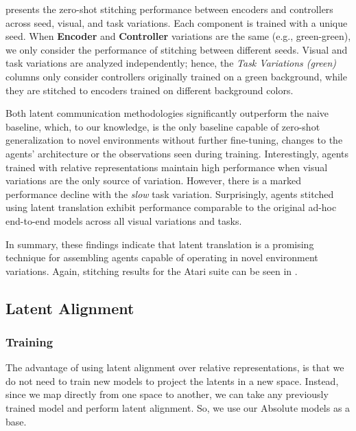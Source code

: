  presents the zero-shot stitching performance between encoders and controllers across seed, visual, and task variations. Each component is trained with a unique seed. When \textbf{Encoder} and \textbf{Controller} variations are the same (e.g., green-green), we only consider the performance of stitching between different seeds. Visual and task variations are analyzed independently; hence, the \textit{Task Variations (green)} columns only consider controllers originally trained on a green background, while they are stitched to encoders trained on different background colors.

Both latent communication methodologies significantly outperform the naive baseline, which, to our knowledge, is the only baseline capable of zero-shot generalization to novel environments without further fine-tuning, changes to the agents' architecture or the observations  seen during training. Interestingly, agents trained with relative representations maintain high performance when visual variations are the only source of variation. However, there is a marked performance decline with the \textit{slow} task variation. Surprisingly, agents stitched using latent translation exhibit performance comparable to the original ad-hoc end-to-end models across all visual variations and tasks.

In summary, these findings indicate that latent translation is a promising technique for assembling agents capable of operating in novel environment variations. Again, stitching results for the Atari suite can be seen in .
 
\iffalse
\subsection{Latent Alignment}\label{sec:alignment}
\subsubsection{Training}\label{sec:alignment_training}
The advantage of using latent alignment over relative representations, is that we do not need to train new models to project the latents in a new space. Instead, since we map directly from one space to another, we can take any previously trained model and perform latent alignment. So, we use our Absolute models as a base.





